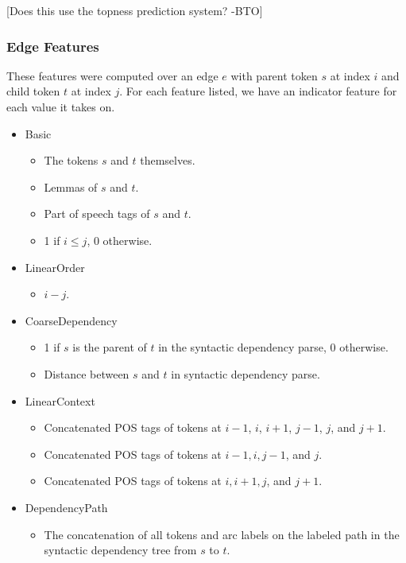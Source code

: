 \documentclass[11pt]{article}
\newcommand{\bocomment}[1]{\textcolor{Bittersweet}{[#1 -BTO]}}
\begin{document}
\bocomment{Does this use the topness prediction system?}



\subsubsection{Edge Features}
\label{s:edgefeatures}

\label{s:features}
These features were computed over an edge $e$ with parent token $s$ at index
$i$ and child token $t$ at index $j$. 
For each feature listed, we have an indicator feature for each value it takes
on.

\begin{itemize}
	\item Basic
	\begin{itemize}
		\item The tokens $s$ and $t$ themselves.
		\item Lemmas of $s$ and $t$.
		\item Part of speech tags of $s$ and $t$.
		\item 1 if $i \le j$, 0 otherwise.
	\end{itemize}
	\item LinearOrder
		\begin{itemize}
		\item $i - j$.
	\end{itemize}
	\item CoarseDependency
		\begin{itemize}
		\item 1 if $s$ is the parent of $t$ in the syntactic dependency parse, 0
		otherwise.
		\item Distance between $s$ and $t$ in syntactic dependency parse.
	\end{itemize}
	\item LinearContext
		\begin{itemize}
		\item Concatenated POS tags of tokens at $i-1$, $i$, $i+1$, $j-1$, $j$,
		and $j+1$.
		\item Concatenated POS tags of tokens at $i-1, i, j-1$, and $j$.
		\item Concatenated POS tags of tokens at $i, i+1, j$, and $j+1$.
	\end{itemize}
	\item DependencyPath
		\begin{itemize}
		\item The concatenation of all tokens and arc labels on the labeled path in
		the syntactic dependency tree from $s$ to $t$.

\end{itemize}
\end{itemize}
\end{document}
